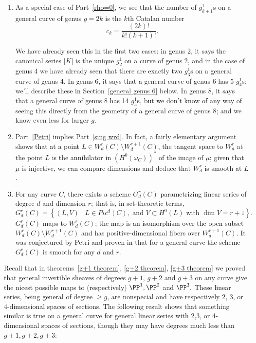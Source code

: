 \begin{remark}
\begin{enumerate}
\item As a special case of Part~\ref{rho=0}, we see that the number of $g^1_{k+1}$s on a general curve of genus $g = 2k$ is the $k$th Catalan number 
$$
c_k = \frac{(2k)!}{k!(k+1)!}.
$$


We have already seen this in the first two cases: in genus 2, it says the canonical series $|K|$ is the unique $g^1_2$ on a curve of genus 2, and in the case of genus 4 we have already seen  that there are exactly two $g^1_3$s on a general curve of genus 4. In genus 6, it says that a general curve of genus 6 has 5 $g^1_4$s; we'll describe these in Section~\ref{general genus 6} below.  In genus 8, it says that a general curve of genus 8 has 14 $g^1_5$s, but we don't know of any way of seeing this directly from the geometry of a general curve of genus 8; and we know even less for larger $g$.

\item Part~\ref{Petri} implies Part~\ref{sing wrd}. In fact, a fairly elementary argument shows that at a point $L \in W^r_d(C) \setminus W^{r+1}_d(C)$, the tangent space to $W^r_d$ at the point $L$ is the annihilator
in $(H^0(\omega_C))^*$ of the image of $\mu$; given that $\mu$ is injective, we can compare dimensions and deduce that $W^r_d$ is smooth at $L$.

\item For any curve $C$, there exists a scheme $G^r_d(C)$ parametrizing linear series of degree $d$ and dimension $r$; that is, in set-theoretic terms,
$$
G^r_d(C) = \left\{ (L, V) \mid L \in Pic^d(C), \text{ and } V \subset H^0(L) \text{ with } \dim V = r+1 \right\}.
$$
$G^r_d(C)$ maps to $W^r_d(C)$; the map is an isomorphism over the open subset $W^r_d(C) \setminus W^{r+1}_d(C)$ and has positive-dimensional fibers over $W^{r+1}_d(C)$. It was conjectured
by Petri and proven in \cite{Gieseker-Petri} that for a general curve the scheme $G^r_d(C)$ is smooth for any $d$ and $r$.
\end{enumerate}
\end{remark}


Recall that  in theorems~\ref{g+1 theorem}, \ref{g+2 theorem}, \ref{g+3 theorem} we proved that
general invertible sheaves of degrees $g+1$, $g+2$ and $g+3$ on any curve
give the nicest possible maps to (respectively) $\PP^1, \PP^2$ and $\PP^3.$ These
linear series, being general of degree $\geq g$, are  nonspecial and have respectively
2, 3, or 4-dimensional spaces of sections. The following result shows that something
similar is true on a general curve for general linear series with 2,3, or 4-dimensional
spaces of sections, though they may have degrees much less than $g+1, g+2, g+3$:

